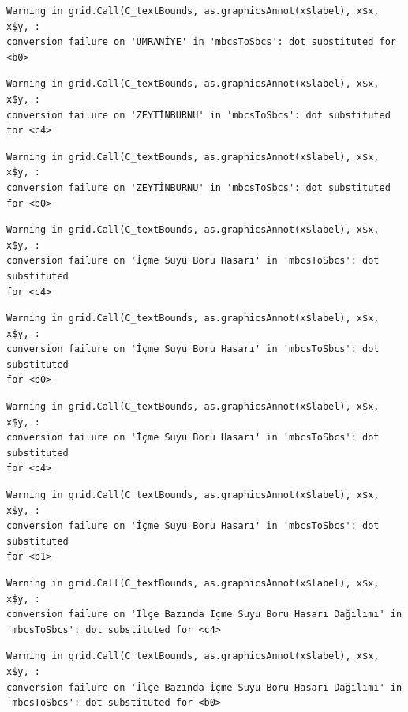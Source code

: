 \documentclass[
  11pt,
  a4paper,
  DIV=11,
  numbers=noendperiod]{scrartcl}
\begin{document}
\begin{verbatim}
Warning in grid.Call(C_textBounds, as.graphicsAnnot(x$label), x$x, x$y, :
conversion failure on 'ÜMRANİYE' in 'mbcsToSbcs': dot substituted for <b0>
\end{verbatim}

\begin{verbatim}
Warning in grid.Call(C_textBounds, as.graphicsAnnot(x$label), x$x, x$y, :
conversion failure on 'ZEYTİNBURNU' in 'mbcsToSbcs': dot substituted for <c4>
\end{verbatim}

\begin{verbatim}
Warning in grid.Call(C_textBounds, as.graphicsAnnot(x$label), x$x, x$y, :
conversion failure on 'ZEYTİNBURNU' in 'mbcsToSbcs': dot substituted for <b0>
\end{verbatim}

\begin{verbatim}
Warning in grid.Call(C_textBounds, as.graphicsAnnot(x$label), x$x, x$y, :
conversion failure on 'İçme Suyu Boru Hasarı' in 'mbcsToSbcs': dot substituted
for <c4>
\end{verbatim}

\begin{verbatim}
Warning in grid.Call(C_textBounds, as.graphicsAnnot(x$label), x$x, x$y, :
conversion failure on 'İçme Suyu Boru Hasarı' in 'mbcsToSbcs': dot substituted
for <b0>
\end{verbatim}

\begin{verbatim}
Warning in grid.Call(C_textBounds, as.graphicsAnnot(x$label), x$x, x$y, :
conversion failure on 'İçme Suyu Boru Hasarı' in 'mbcsToSbcs': dot substituted
for <c4>
\end{verbatim}

\begin{verbatim}
Warning in grid.Call(C_textBounds, as.graphicsAnnot(x$label), x$x, x$y, :
conversion failure on 'İçme Suyu Boru Hasarı' in 'mbcsToSbcs': dot substituted
for <b1>
\end{verbatim}

\begin{verbatim}
Warning in grid.Call(C_textBounds, as.graphicsAnnot(x$label), x$x, x$y, :
conversion failure on 'İlçe Bazında İçme Suyu Boru Hasarı Dağılımı' in
'mbcsToSbcs': dot substituted for <c4>
\end{verbatim}

\begin{verbatim}
Warning in grid.Call(C_textBounds, as.graphicsAnnot(x$label), x$x, x$y, :
conversion failure on 'İlçe Bazında İçme Suyu Boru Hasarı Dağılımı' in
'mbcsToSbcs': dot substituted for <b0>
\end{verbatim}
\end{document}
